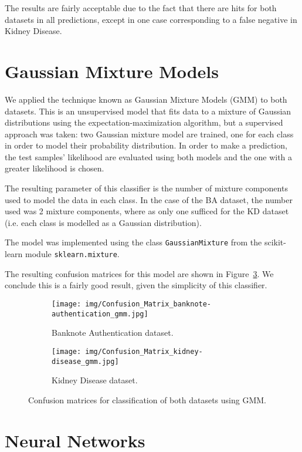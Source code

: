 \documentclass[11pt,a4paper]{article}
\begin{document}
The results are fairly acceptable due to the fact that there are hits for both datasets in all predictions, except in one case corresponding to a false negative in Kidney Disease.

\section{Gaussian Mixture Models}
We applied the technique known as Gaussian Mixture Models (GMM) to both datasets. This is an unsupervised model that fits data to a mixture of Gaussian distributions using the expectation-maximization algorithm, but a supervised approach was taken: two Gaussian mixture model are trained, one for each class in order to model their probability distribution. In order to make a prediction, the test samples' likelihood are evaluated using both models and the one with a greater likelihood is chosen.

The resulting parameter of this classifier is the number of mixture components used to model the data in each class. In the case of the BA dataset, the number used was 2 mixture components, where as only one sufficed for the KD dataset (i.e. each class is modelled as a Gaussian distribution).

The model was implemented using the class \texttt{GaussianMixture} from the scikit-learn module \texttt{sklearn.mixture}.

The resulting confusion matrices for this model are shown in Figure~\ref{cm_gmm}. We conclude this is a fairly good result, given the simplicity of this classifier.

\begin{figure}[H]
\centering
\begin{subfigure}{.5\textwidth}
  \centering
  \texttt{[image: img/Confusion\_Matrix\_banknote-authentication\_gmm.jpg]}
  \caption{Banknote Authentication dataset.}
  \label{fig:sub1}
\end{subfigure}%
\begin{subfigure}{.5\textwidth}
  \centering
  \texttt{[image: img/Confusion\_Matrix\_kidney-disease\_gmm.jpg]}
  \caption{Kidney Disease dataset.}
  \label{fig:sub2}
\end{subfigure}
\caption{Confusion matrices for classification of both datasets using GMM.}
\label{cm_gmm}
\end{figure}

\section{Neural Networks}
\end{document}
